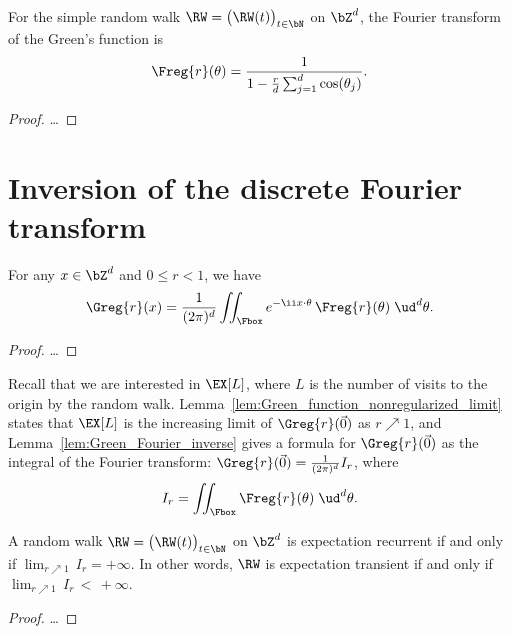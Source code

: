 \begin{lemma}
  \label{lem:SRW_Green_Fourier}
  For the simple random walk $\RW = \big(\RW(t)\big)_{t \in \bN}$ on $\bZ^d$,
  the Fourier transform of the Green's function is
  \begin{align*}
  \Freg{r} (\theta) = \frac{1}{1-\frac{r}{d} \sum_{j=1}^d \cos(\theta_j)} .
  \end{align*}
\end{lemma}
\begin{proof}
\ldots
\end{proof}

\section{Inversion of the discrete Fourier transform}

\begin{lemma}
  \label{lem:Green_Fourier_inverse}
  \leanok %
  For any $x \in \bZ^d$ and $0 \le r < 1$, we have
  \begin{align*}
  \Greg{r} (x)
  = \frac{1}{(2\pi)^d} \iint_{\Fbox} e^{-\ii x \cdot \theta} \, \Freg{r} (\theta) \; \ud^d \theta .
  \end{align*}
\end{lemma}
\begin{proof}
\ldots
\end{proof}

Recall that we are interested in $\EX[L]$, where $L$ is the number of visits to the
origin by the random walk. Lemma~\ref{lem:Green_function_nonregularized_limit}
states that $\EX[L]$ is the increasing limit of $\Greg{r}(\vec{0})$ as $r \nearrow 1$,
and Lemma~\ref{lem:Green_Fourier_inverse} gives a formula for $\Greg{r}(\vec{0})$
as the integral of the Fourier transform: $\Greg{r}(\vec{0}) = \frac{1}{(2\pi)^d} I_r$,
where
\begin{align}
I_r = \iint_{\Fbox} \Freg{r} (\theta) \; \ud^d \theta .
\end{align}

\begin{corollary}
  \label{cor:recurrence_iff_finite_limit_integral}
  A random walk $\RW = \big(\RW(t)\big)_{t \in \bN}$ on $\bZ^d$
  is expectation recurrent if and only if $\lim_{r \nearrow 1} \, I_r = +\infty$.
  In other words, $\RW$ is expectation transient if and only if
  $\lim_{r \nearrow 1} \, I_r \, < \, +\infty$.
\end{corollary}
\begin{proof}
\ldots
\end{proof}



